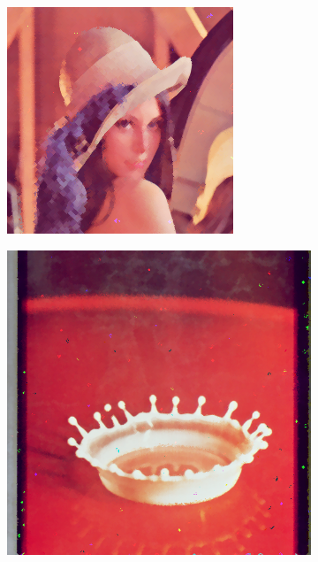 \begin{subfigure}{0.9\textwidth}
   \centering
\begin{subfigure}[t]{0.15\textwidth}
    \includegraphics[width=0.9\linewidth]{../images/outputs/denoise/co/co0.png}
    
    \centering
  \end{subfigure}
\begin{subfigure}[t]{0.15\textwidth}
    \includegraphics[width=0.9\linewidth]{../images/outputs/denoise/co/co1.png}
    

\end{subfigure}
\end{subfigure}
